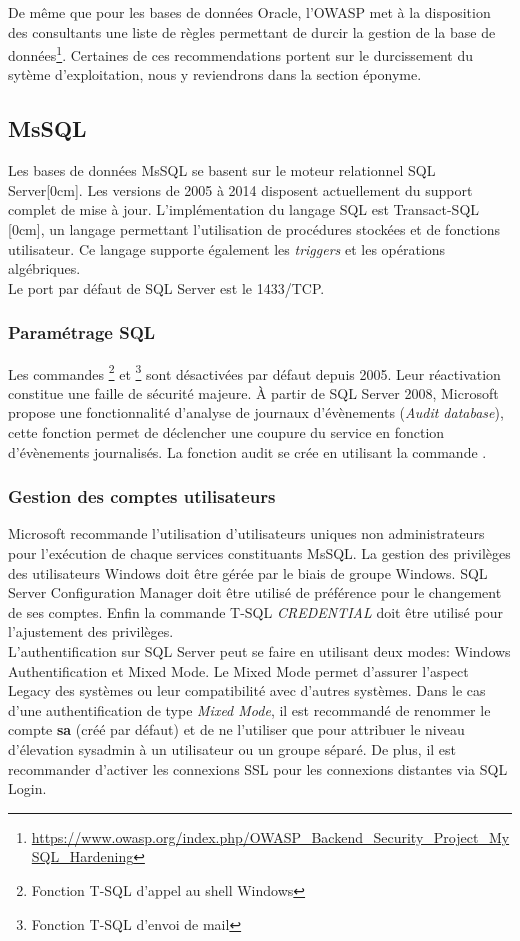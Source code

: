 \documentclass[twoside,a4paper,12pt,titlepage]{book}
\newcommand{\MarginPar}[2]{\marginnote{\scriptsize #1}[#2]}
\begin{document}
De même que pour les bases de données Oracle, l'OWASP met à la disposition des consultants une liste de règles permettant de durcir la gestion de la base de données\footnote{\url{https://www.owasp.org/index.php/OWASP_Backend_Security_Project_MySQL_Hardening}}. Certaines de ces recommendations portent sur le durcissement du sytème d'exploitation, nous y reviendrons dans la section éponyme. 

\subsection{MsSQL}
Les bases de données MsSQL se basent sur le moteur relationnel SQL Server\MarginPar{\textbf{SQL Server}}{0cm}. Les versions de 2005 à 2014 disposent actuellement du support complet de mise à jour. L'implémentation du langage SQL est Transact-SQL \MarginPar{\textbf{Transact-SQL}}{0cm}, un langage permettant l'utilisation de procédures stockées et de fonctions utilisateur. Ce langage supporte également les \textit{triggers} et les opérations algébriques.\\
Le port par défaut de SQL Server est le 1433/TCP.

\subsubsection{Paramétrage SQL}
Les commandes \footnote{Fonction T-SQL d'appel au shell Windows} et \footnote{Fonction T-SQL d'envoi de mail} sont désactivées par défaut depuis 2005. Leur réactivation constitue une faille de sécurité majeure. À partir de SQL Server 2008, Microsoft propose une fonctionnalité d'analyse de journaux d'évènements (\textit{Audit database}), cette fonction permet de déclencher une coupure du service en fonction d'évènements journalisés. La fonction audit se crée en utilisant la commande .

\subsubsection{Gestion des comptes utilisateurs}
Microsoft recommande l'utilisation d'utilisateurs uniques non administrateurs pour l'exécution de chaque services constituants MsSQL. La gestion des privilèges des utilisateurs Windows doit être gérée par le biais de groupe Windows. SQL Server Configuration Manager doit être utilisé de préférence pour le changement de ses comptes. Enfin la commande T-SQL \textit{CREDENTIAL} doit être utilisé pour l'ajustement des privilèges.\\
L'authentification sur SQL Server peut se faire en utilisant deux modes: Windows Authentification et Mixed Mode. Le Mixed Mode permet d'assurer l'aspect Legacy des systèmes ou leur compatibilité avec d'autres systèmes. Dans le cas d'une authentification de type \textit{Mixed Mode}, il est recommandé de renommer le compte \textbf{sa} (créé par défaut) et de ne l'utiliser que pour attribuer le niveau d'élevation sysadmin à un utilisateur ou un groupe séparé. De plus, il est recommander d'activer les connexions SSL pour les connexions distantes via SQL Login.
\end{document}
